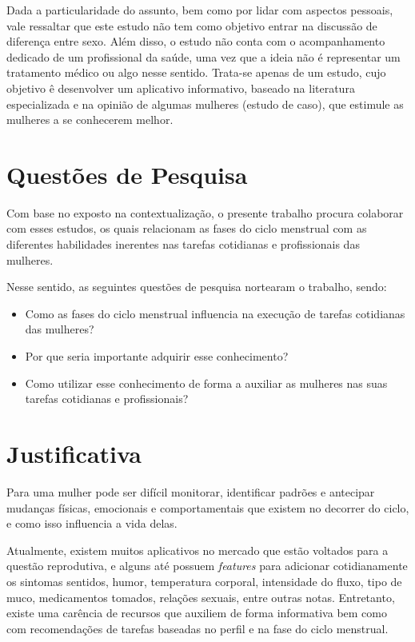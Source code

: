 Dada a particularidade do assunto, bem como por lidar com aspectos pessoais, vale ressaltar que este 
estudo não tem como objetivo entrar na discussão de diferença entre sexo. Além disso, o estudo não 
conta com o acompanhamento dedicado de um profissional da saúde, uma vez que a ideia não é representar 
um tratamento médico ou algo nesse sentido. Trata-se apenas de um estudo, cujo objetivo ê desenvolver 
um aplicativo informativo, baseado na literatura especializada e na opinião de algumas mulheres (estudo de caso), 
que estimule as mulheres a 
se conhecerem melhor. 


\section{Questões de Pesquisa}

Com base no exposto na contextualização, o presente trabalho procura colaborar com esses estudos, 
os quais relacionam as fases do ciclo menstrual com as diferentes habilidades inerentes nas tarefas 
cotidianas e profissionais das mulheres.

Nesse sentido, as seguintes questões de pesquisa nortearam o trabalho, sendo:

\begin{itemize}

        \item Como as fases do ciclo menstrual influencia na execução de tarefas cotidianas das mulheres?

        \item Por que seria importante adquirir esse conhecimento? 

        \item Como utilizar esse conhecimento de forma a auxiliar as mulheres nas suas tarefas cotidianas e profissionais?

\end{itemize}

\section{Justificativa}

Para uma mulher pode ser difícil monitorar, identificar padrões e antecipar mudanças físicas, 
emocionais e comportamentais que existem no decorrer do ciclo, e como isso influencia a vida delas.

Atualmente, existem muitos aplicativos no mercado que estão voltados para a questão reprodutiva, 
e alguns até possuem \textit{features} para adicionar cotidianamente os sintomas sentidos, humor, 
temperatura corporal, intensidade do fluxo, tipo de muco, medicamentos tomados, relações sexuais, 
entre outras notas. Entretanto, existe uma carência de recursos que auxiliem de forma informativa bem 
como com recomendações de tarefas baseadas no perfil e na fase do ciclo menstrual.

